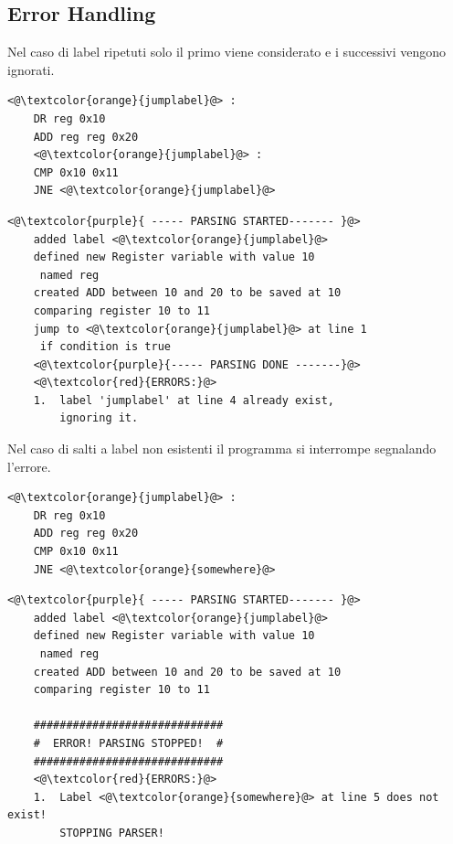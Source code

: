 \newpage
\subsection{Error Handling}
Nel caso di label ripetuti solo il primo viene considerato e i successivi vengono ignorati.
\begin{lstlisting}[caption=input]
    <@\textcolor{orange}{jumplabel}@> :
    DR reg 0x10
    ADD reg reg 0x20
    <@\textcolor{orange}{jumplabel}@> :
    CMP 0x10 0x11
    JNE <@\textcolor{orange}{jumplabel}@>
\end{lstlisting}
\begin{lstlisting}[caption=output]
    <@\textcolor{purple}{ ----- PARSING STARTED------- }@>
    added label <@\textcolor{orange}{jumplabel}@>
    defined new Register variable with value 10 
     named reg
    created ADD between 10 and 20 to be saved at 10
    comparing register 10 to 11
    jump to <@\textcolor{orange}{jumplabel}@> at line 1
     if condition is true
    <@\textcolor{purple}{----- PARSING DONE -------}@>
    <@\textcolor{red}{ERRORS:}@>
    1.	label 'jumplabel' at line 4 already exist, 
        ignoring it.
\end{lstlisting}
\newpage
Nel caso di salti a label non esistenti il programma si interrompe segnalando l'errore.
\begin{lstlisting}[caption=input]
    <@\textcolor{orange}{jumplabel}@> :
    DR reg 0x10
    ADD reg reg 0x20
    CMP 0x10 0x11
    JNE <@\textcolor{orange}{somewhere}@>
\end{lstlisting}
\begin{lstlisting}[caption=output]
    <@\textcolor{purple}{ ----- PARSING STARTED------- }@>
    added label <@\textcolor{orange}{jumplabel}@>
    defined new Register variable with value 10 
     named reg
    created ADD between 10 and 20 to be saved at 10
    comparing register 10 to 11
    
    #############################
    #  ERROR! PARSING STOPPED!  #
    #############################
    <@\textcolor{red}{ERRORS:}@>
    1.	Label <@\textcolor{orange}{somewhere}@> at line 5 does not exist! 
        STOPPING PARSER!
\end{lstlisting}
\newpage
